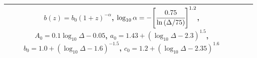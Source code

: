 \begin{table}
\begin{tabular}{cp{6.5cm}p{5cm}}
        $b\left(z\right)=b_0{\left(1+z\right)}^{-\alpha}$,\newline
        $\log_{10}\alpha=
        -{\left[\cfrac{0.75}{\ln\left(\Delta/75\right)}\right]}^{1.2}$,\newline
        $A_0=0.1\log_{10}\Delta-0.05$,\newline
        $a_0=1.43+{\left(\log_{10}\Delta-2.3\right)}^{1.5}$,\newline
        $b_0=1.0+{\left(\log_{10}\Delta-1.6\right)}^{-1.5}$,\newline
        $c_0=1.2+{\left(\log_{10}\Delta-2.35\right)}^{1.6}$ \\
        \bottomrule
    \end{tabular}
\end{table}
